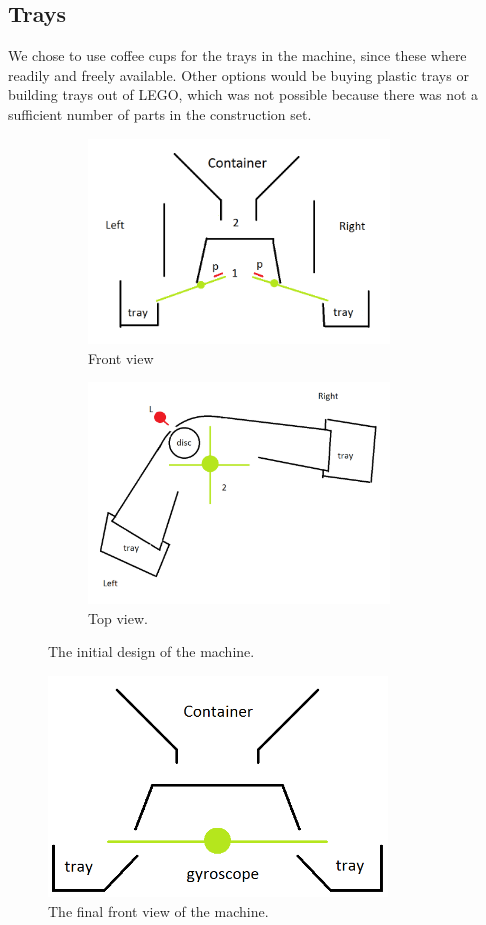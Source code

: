 \documentclass[a4paper,oneside,11pt]{article}
\begin{document}
\subsection{Trays}
We chose to use coffee cups for the trays in the machine, since these where readily and freely available. Other options would be buying plastic trays or building trays out of LEGO, which was not possible because there was not a sufficient number of parts in the construction set.

\begin{figure}[H]
\begin{subfigure}{0.5\textwidth}
	\centering
	\includegraphics[width=80mm]{front}
	\caption{\label{firstfront}Front view}	
\end{subfigure}	
\begin{subfigure}{0.5\textwidth}
\centering
	\includegraphics[width=80mm]{top}
	\caption{\label{top}Top view.}
\end{subfigure}	
\caption{The initial design of the machine.}
\end{figure}

\begin{figure}[H]
	\centering
	\includegraphics[width=90mm]{frontnew}
	\caption{\label{front}The final front view of the machine.}
\end{figure}
\end{document}
